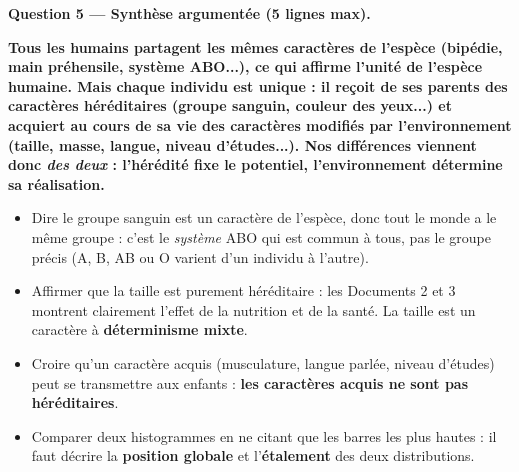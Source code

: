 \documentclass[11pt]{article}
\newcommand{\cle}[1]{{\popxbold\color{popdark}#1}}
\begin{document}
\begin{exoresolu}
\medskip
\textbf{Question 5 — Synthèse argumentée (5 lignes max).}
\par
\og \textbf{Tous les humains partagent les mêmes \cle{caractères de l'espèce} (bipédie, main préhensile, système ABO...), ce qui affirme l'unité de l'espèce humaine. Mais chaque individu est unique : il reçoit de ses parents des \cle{caractères héréditaires} (groupe sanguin, couleur des yeux...) et acquiert au cours de sa vie des \cle{caractères modifiés par l'environnement} (taille, masse, langue, niveau d'études...). Nos différences viennent donc \emph{des deux} : l'hérédité fixe le potentiel, l'environnement détermine sa réalisation.} \fg
\end{exoresolu}

\begin{attention}
\begin{itemize}
    \item Dire \og le groupe sanguin est un caractère de l'espèce, donc tout le monde a le même groupe \fg : c'est le \emph{système} ABO qui est commun à tous, pas le groupe précis (A, B, AB ou O varient d'un individu à l'autre).
    \item Affirmer que la taille est \og purement héréditaire \fg : les Documents 2 et 3 montrent clairement l'effet de la nutrition et de la santé. La taille est un caractère à \textbf{déterminisme mixte}.
    \item Croire qu'un caractère acquis (musculature, langue parlée, niveau d'études) peut se transmettre aux enfants : \textbf{les caractères acquis ne sont pas héréditaires}.
    \item Comparer deux histogrammes en ne citant que les barres les plus hautes : il faut décrire la \textbf{position globale} et l'\textbf{étalement} des deux distributions.
\end{itemize}
\end{attention}
\end{document}
